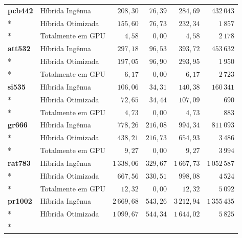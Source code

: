 \begin{tabeladensa}
\begin{longtable}[]{@{}llrrrr@{}}
  \midrule
  \textbf{pcb442}   & Híbrida Ingênua   & \(208{,}30\)    & \(76{,}39\)  & \(284{,}69\)    & \(432\,043\)    \\*
                    & Híbrida Otimizada & \(155{,}60\)    & \(76{,}73\)  & \(232{,}34\)    & \(1\,857\)      \\*
                    & Totalmente em GPU & \(4{,}58\)      & \(0{,}00\)   & \(4{,}58\)      & \(2\,178\)      \\
  \midrule
  \textbf{att532}   & Híbrida Ingênua   & \(297{,}18\)    & \(96{,}53\)  & \(393{,}72\)    & \(453\,632\)    \\*
                    & Híbrida Otimizada & \(197{,}05\)    & \(96{,}90\)  & \(293{,}95\)    & \(1\,950\)      \\*
                    & Totalmente em GPU & \(6{,}17\)      & \(0{,}00\)   & \(6{,}17\)      & \(2\,723\)      \\
  \midrule
  \textbf{si535}    & Híbrida Ingênua   & \(106{,}06\)    & \(34{,}31\)  & \(140{,}38\)    & \(160\,341\)    \\*
                    & Híbrida Otimizada & \(72{,}65\)     & \(34{,}44\)  & \(107{,}09\)    & \(690\)         \\*
                    & Totalmente em GPU & \(4{,}73\)      & \(0{,}00\)   & \(4{,}73\)      & \(883\)         \\
  \midrule
  \textbf{gr666}    & Híbrida Ingênua   & \(778{,}26\)    & \(216{,}08\) & \(994{,}34\)    & \(811\,093\)    \\*
                    & Híbrida Otimizada & \(438{,}21\)    & \(216{,}73\) & \(654{,}93\)    & \(3\,486\)      \\*
                    & Totalmente em GPU & \(9{,}27\)      & \(0{,}00\)   & \(9{,}27\)      & \(3\,994\)      \\
  \midrule
  \textbf{rat783}   & Híbrida Ingênua   & \(1\,338{,}06\) & \(329{,}67\) & \(1\,667{,}73\) & \(1\,052\,587\) \\*
                    & Híbrida Otimizada & \(667{,}56\)    & \(330{,}51\) & \(998{,}08\)    & \(4\,524\)      \\*
                    & Totalmente em GPU & \(12{,}32\)     & \(0{,}00\)   & \(12{,}32\)     & \(5\,092\)      \\
  \midrule
  \textbf{pr1002}   & Híbrida Ingênua   & \(2\,669{,}68\) & \(543{,}26\) & \(3\,212{,}94\) & \(1\,355\,435\) \\*
                    & Híbrida Otimizada & \(1\,099{,}67\) & \(544{,}34\) & \(1\,644{,}02\) & \(5\,825\)      \\*

\end{longtable}
\end{tabeladensa}
